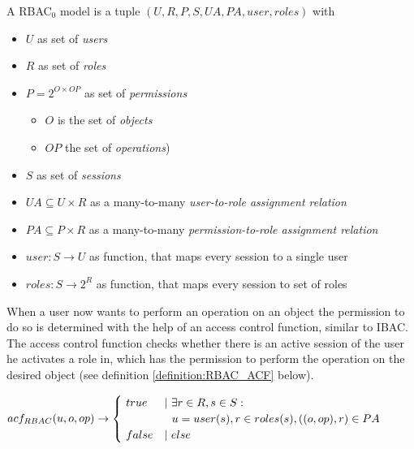 \documentclass[twoside, openright, 12pt]{book}
\begin{document}
\begin{xdefinition}[RBAC] 
A RBAC$_0$ model is a tuple $(U, R, P, S, UA, PA, user, roles)$ with

\vspace{-2mm}
\begin{itemize}
\setlength\itemsep{0em}
\item $U$ as set of \textit{users}
\item $R$ as set of \textit{roles}
\item $P = 2^{O \times OP}$ as set of \textit{permissions}
\vspace{-2mm}
\begin{itemize}
\item $O$ is the set of \textit{objects}
\item $OP$ the set of \textit{operations})
\end{itemize}
\vspace{-2mm}
\item $S$ as set of \textit{sessions}
\item $UA \subseteq U \times R$ as a many-to-many \textit{user-to-role assignment relation}
\item $PA \subseteq P \times R$ as a many-to-many \textit{permission-to-role assignment relation}
\item $user: S \rightarrow U$ as function, that maps every session to a single user
\item $roles: S \rightarrow 2^R$ as function, that maps every session to set of roles
\end{itemize}
\label{definition:RBAC}
\end{xdefinition}

\noindent
When a user now wants to perform an operation on an object the permission to do so is determined with the help of an access control function, similar to IBAC.
The access control function checks whether there is an active session of the user he activates a role in, which has the permission to perform the operation on the desired object (see definition \ref{definition:RBAC_ACF} below).

\begin{xdefinition}
$\\[-15pt]
acf_{RBAC} (u,o,op) \rightarrow 
   \begin{cases}
   		\ true & |\ \exists r \in R, s \in S: \\ & \ \ u = user(s), r \in roles(s), ((o,op),r) \in PA \\
   		\ false & |\ else
   \end{cases}
$
\label{definition:RBAC_ACF}
\end{xdefinition}
\end{document}
